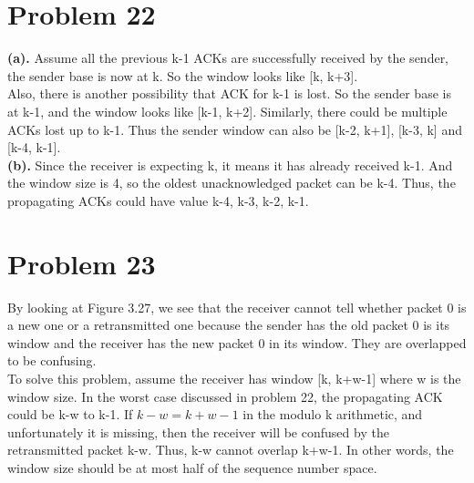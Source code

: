 \documentclass[titlepage, paper=a4, fontsize=11pt]{scrartcl} %
\numberwithin{equation}{section} %
\numberwithin{table}{section} %
\begin{document}

\section*{Problem 22}
\textbf{(a). }
Assume all the previous k-1 ACKs are successfully received by the sender, the sender base is now at
k. So the window looks like [k, k+3]. \\
Also, there is another possibility that ACK for k-1 is lost. So the sender base is at k-1, and the window looks like [k-1, k+2]. Similarly, there could be multiple ACKs lost up to k-1. Thus the sender window can also be [k-2, k+1], [k-3, k] and [k-4, k-1]. \\

\textbf{(b).}
Since the receiver is expecting k, it means it has already received k-1. And the window size is 4, so the oldest unacknowledged packet can be k-4. Thus, the propagating ACKs could have value k-4, k-3, k-2, k-1.
\\



\section*{Problem 23}
By looking at Figure 3.27, we see that the receiver cannot tell whether packet 0 is a new one or a retransmitted one because the sender has the old packet 0 is its window and the receiver has the new packet 0 in its window. They are overlapped to be confusing. \\
To solve this problem, assume the receiver has window [k, k+w-1] where w is the window size. In the worst case discussed in problem 22, the propagating ACK could be k-w to k-1. If $k-w = k+w-1$ in the modulo k arithmetic, and unfortunately it is missing, then the receiver will be confused by the retransmitted packet k-w. Thus, k-w cannot overlap k+w-1. In other words, the window size should be at most half of the sequence number space.
\\
\end{document}

